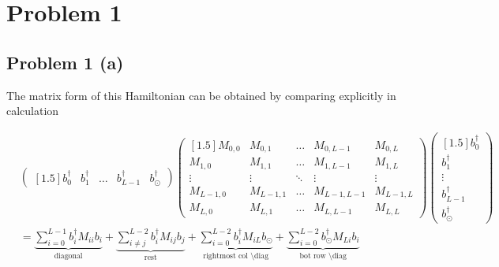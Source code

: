 \section{Problem 1}

\subsection{Problem 1 (a)}
    \label{sec:a}
    The matrix form of this Hamiltonian can be obtained by comparing explicitly in calculation
    
    \begin{align}
        &\begin{pmatrix}[1.5]
            b^\dagger_0 & b^\dagger_1 & \hdots & b^\dagger_{L-1} & b^\dagger_\odot
        \end{pmatrix}
        \begin{pmatrix}[1.5]
            M_{0,0} & M_{0,1} & \hdots & M_{0,L-1} & M_{0,L} \\
            M_{1,0} & M_{1,1} & \hdots & M_{1,L-1} & M_{1,L} \\
            \vdots & \vdots & \ddots & \vdots & \vdots \\
            M_{L-1,0} & M_{L-1,1} & \hdots & M_{L-1,L-1} & M_{L-1,L} \\
            M_{L,0} & M_{L,1} & \hdots & M_{L,L-1} & M_{L,L}
        \end{pmatrix}
        \begin{pmatrix}[1.5]
            b^\dagger_0 \\ b^\dagger_1 \\ \vdots \\ b^\dagger_{L-1} \\ b^\dagger_{\odot}
        \end{pmatrix} \\
        & = \underbrace{\sum_{i=0}^{L-1} b^\dagger_i M_{ii} b_i}_\text{diagonal} + \underbrace{\sum_{i\neq j}^{L-2} b^\dagger_iM_{ij}b_j}_\text{rest} + \underbrace{\sum_{i=0}^{L-2} b^\dagger_iM_{iL}b_\odot}_\text{rightmost col \textbackslash diag} + \underbrace{\sum_{i=0}^{L-2} b^\dagger_\odot M_{Li}b_i}_\text{bot row \textbackslash diag}
    \end{align}
    
